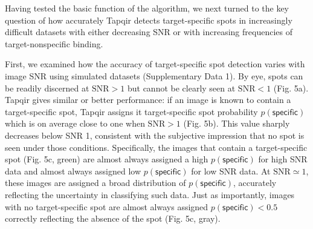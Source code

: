 Having tested the basic function of the algorithm, we next turned to the key question of how accurately Tapqir detects target-specific spots in increasingly difficult datasets with either decreasing SNR or with increasing frequencies of target-nonspecific binding.  

First, we examined how the accuracy of target-specific spot detection varies with  image SNR using simulated datasets (Supplementary Data 1). By eye, spots can be readily discerned at $\mathrm{SNR}>1$ but cannot be clearly seen at $\mathrm{SNR}<1$ (Fig. 5a). Tapqir gives similar or better performance:  if an image is known to contain a target-specific spot, Tapqir assigns it target-specific spot probability $p(\mathsf{specific})$ which is on average close to  one when $\mathrm{SNR}>1$ (Fig. 5b).  This value sharply decreases below SNR 1, consistent with the subjective impression that no spot is seen under those conditions.  Specifically, the images that contain a target-specific spot (Fig. 5c, green) are almost always assigned a high $p(\mathsf{specific})$ for high SNR data and almost always assigned low $p(\mathsf{specific})$ for low SNR data.  At $\mathrm{SNR} \simeq 1$, these images are assigned a broad distribution of $p(\mathsf{specific})$, accurately reflecting the uncertainty in classifying such data.  Just as importantly, images with no target-specific spot are almost always assigned $p(\mathsf{specific}) < 0.5$ correctly reflecting the absence of the spot (Fig. 5c, gray).



